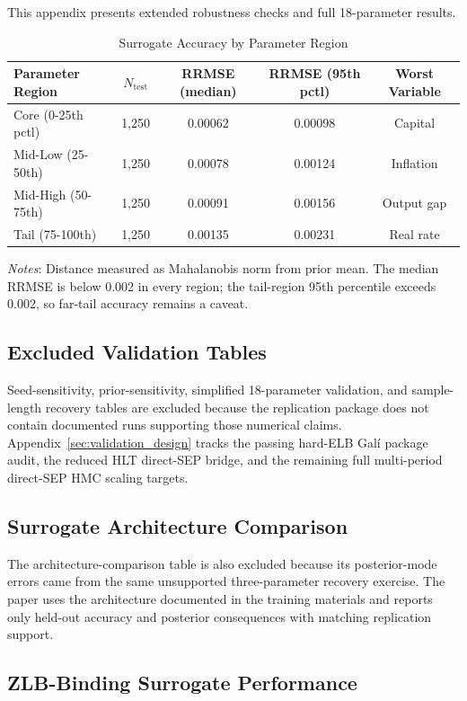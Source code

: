 \documentclass[12pt]{article}
\theoremstyle{plain}
\theoremstyle{definition}
\theoremstyle{remark}
\newcommand{\tablenotes}[1]{%
  \par\vspace{0.5em}%
  \noindent\begin{minipage}{\textwidth}%
  \raggedright\footnotesize #1%
  \end{minipage}\par%
}
\begin{document}
This appendix presents extended robustness checks and full 18-parameter results.

\begin{table}[htbp]
\centering
\caption{Surrogate Accuracy by Parameter Region}
\label{tab:surrogate_regional_accuracy}
\begin{tabular}{lcccc}
\toprule
Parameter Region & $N_{\text{test}}$ & RRMSE (median) & RRMSE (95th pctl) & Worst Variable \\
\midrule
Core (0-25th pctl) & 1,250 & 0.00062 & 0.00098 & Capital \\
Mid-Low (25-50th) & 1,250 & 0.00078 & 0.00124 & Inflation \\
Mid-High (50-75th) & 1,250 & 0.00091 & 0.00156 & Output gap \\
Tail (75-100th) & 1,250 & 0.00135 & 0.00231 & Real rate \\
\bottomrule
\end{tabular}
\smallskip
\tablenotes{\textit{Notes}: Distance measured as Mahalanobis norm from prior mean. The median RRMSE is below 0.002 in every region; the tail-region 95th percentile exceeds 0.002, so far-tail accuracy remains a caveat.}
\end{table}

\subsection{Excluded Validation Tables}

Seed-sensitivity, prior-sensitivity, simplified 18-parameter validation, and sample-length recovery tables are excluded because the replication package does not contain documented runs supporting those numerical claims. Appendix~\ref{sec:validation_design} tracks the passing hard-ELB Gal\'i package audit, the reduced HLT direct-SEP bridge, and the remaining full multi-period direct-SEP HMC scaling targets.

\subsection{Surrogate Architecture Comparison}

The architecture-comparison table is also excluded because its posterior-mode errors came from the same unsupported three-parameter recovery exercise. The paper uses the architecture documented in the training materials and reports only held-out accuracy and posterior consequences with matching replication support.

\subsection{ZLB-Binding Surrogate Performance}
\end{document}
